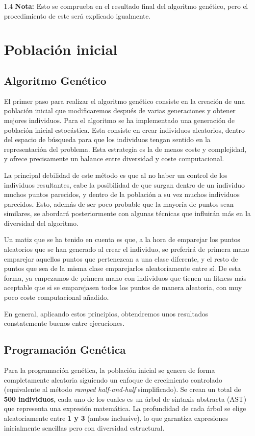 \documentclass{article}
\begin{document}
\begin{spacing}{1.4}
\textbf{Nota:} Esto se comprueba en el resultado final del algoritmo genético, pero el procedimiento
de este será explicado igualmente.\\

\section{Población inicial}
\subsection{Algoritmo Genético}
El primer paso para realizar el algoritmo genético consiste en la creación de una población inicial que modificaremos después de
varias generaciones y obtener mejores individuos. Para el algoritmo se ha implementado una generación de población
inicial estocástica. Esta consiste en crear individuos aleatorios, dentro del espacio de búsqueda para que
los individuos tengan sentido en la representación del problema. Esta estrategia es la de menos coste
y complejidad, y ofrece precisamente un balance entre diversidad y coste computacional.

La principal debilidad de este método es que al no haber un control de los individuos resultantes,
cabe la posibilidad de que surgan dentro de un individuo muchos puntos parecidos, y dentro de la población a su vez muchos
individuos parecidos. Esto, además de ser poco probable que la mayoría de puntos sean similares, se abordará posteriormente
con algunas técnicas que influirán más en la diversidad del algoritmo. 

Un matiz que se ha tenido en cuenta es que, a la hora de emparejar los puntos aleatorios que se han generado al crear el individuo,
se preferirá de primera mano emparejar aquellos puntos que pertenezcan a una clase diferente, y el resto de puntos que sea de la misma clase emparejarlos aleatoriamente entre sí.
De esta forma, ya empezamos de primera mano con individuos que tienen un fitness más aceptable que si se emparejasen todos los puntos de manera 
aleatoria, con muy poco coste computacional añadido.

En general, aplicando estos principios, obtendremos unos resultados constatemente buenos entre ejecuciones.

\subsection{Programación Genética}

Para la programación genética, la población inicial se genera de forma completamente aleatoria siguiendo un enfoque de crecimiento controlado (equivalente al método \textit{ramped half-and-half} simplificado). Se crean un total de \textbf{500 individuos}, cada uno de los cuales es un árbol de sintaxis abstracta (AST) que representa una expresión matemática. La profundidad de cada árbol se elige aleatoriamente entre \textbf{1 y 3} (ambos inclusive), lo que garantiza expresiones inicialmente sencillas pero con diversidad estructural.


\end{spacing}
\end{document}
